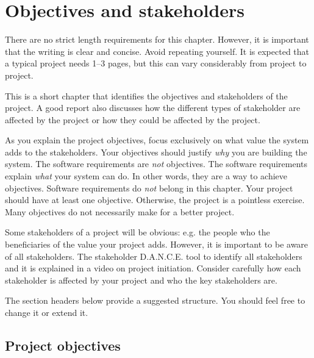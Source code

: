 \chapter{Objectives and stakeholders}
\label{sect:objectives}


\begin{length}
There are no strict length requirements for this chapter.  However, it is important that the writing is clear and concise.  Avoid repeating yourself.  It is expected that a typical project needs 1--3 pages, but this can vary considerably from project to project.
\end{length}

\begin{expectations}
This is a short chapter that identifies the objectives and stakeholders of the project.  A good report also discusses how the different types of stakeholder are affected by the project or how they could be affected by the project.

As you explain the project objectives, focus exclusively on what value the system adds to the stakeholders.  Your objectives should justify \emph{why} you are building the system.  The software requirements are \emph{not} objectives.  The software requirements explain \emph{what} your system can do.  In other words, they are a way to achieve objectives.  Software requirements do \emph{not} belong in this chapter.  Your project should have at least one objective.  Otherwise, the project is a pointless exercise.  Many objectives do not necessarily make for a better project.

Some stakeholders of a project will be obvious: e.g. the people who the beneficiaries of the value your project adds.  However, it is important to be aware of all stakeholders.  The stakeholder D.A.N.C.E. tool to identify all stakeholders and it is explained in a video on project initiation.  Consider carefully how each stakeholder is affected by your project and who the key stakeholders are.

The section headers below provide a suggested structure.  You should feel free to change it or extend it.
\end{expectations}

\section{Project objectives}
\label{sect:objectives}

